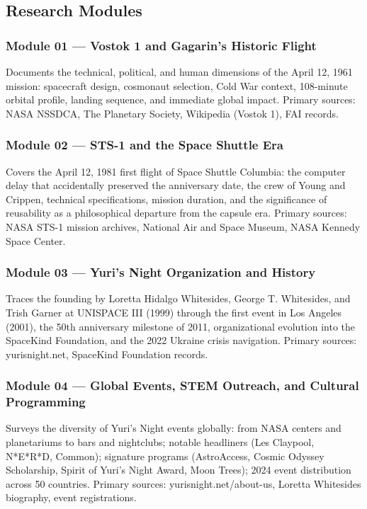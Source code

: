 \documentclass[11pt,letterpaper]{article}
\begin{document}
\subsection{Research Modules}

\subsubsection{Module 01 — Vostok 1 and Gagarin's Historic Flight}
Documents the technical, political, and human dimensions of the April 12, 1961 mission: spacecraft design, cosmonaut selection, Cold War context, 108-minute orbital profile, landing sequence, and immediate global impact. Primary sources: NASA NSSDCA, The Planetary Society, Wikipedia (Vostok 1), FAI records.

\subsubsection{Module 02 — STS-1 and the Space Shuttle Era}
Covers the April 12, 1981 first flight of Space Shuttle Columbia: the computer delay that accidentally preserved the anniversary date, the crew of Young and Crippen, technical specifications, mission duration, and the significance of reusability as a philosophical departure from the capsule era. Primary sources: NASA STS-1 mission archives, National Air and Space Museum, NASA Kennedy Space Center.

\subsubsection{Module 03 — Yuri's Night Organization and History}
Traces the founding by Loretta Hidalgo Whitesides, George T. Whitesides, and Trish Garner at UNISPACE III (1999) through the first event in Los Angeles (2001), the 50th anniversary milestone of 2011, organizational evolution into the SpaceKind Foundation, and the 2022 Ukraine crisis navigation. Primary sources: yurisnight.net, SpaceKind Foundation records.

\subsubsection{Module 04 — Global Events, STEM Outreach, and Cultural Programming}
Surveys the diversity of Yuri's Night events globally: from NASA centers and planetariums to bars and nightclubs; notable headliners (Les Claypool, N*E*R*D, Common); signature programs (AstroAccess, Cosmic Odyssey Scholarship, Spirit of Yuri's Night Award, Moon Trees); 2024 event distribution across 50 countries. Primary sources: yurisnight.net/about-us, Loretta Whitesides biography, event registrations.
\end{document}
